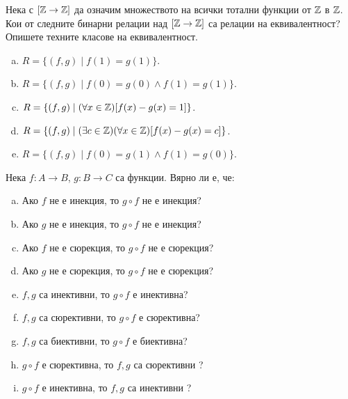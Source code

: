 \begin{problem}
  Нека с $[\mathbb{Z} \to \mathbb{Z}]$ да означим множеството на всички тотални функции от $\mathbb{Z}$ в $\mathbb{Z}$.
  Кои от следните бинарни релации над $[\mathbb{Z}\to\mathbb{Z}]$ са релации на еквивалентност? Опишете техните класове на еквивалентност.
  \begin{enumerate}[a)]
  \item
    $R = \{(f,g)\mid f(1) = g(1)\}$.
  \item
    $R = \{(f,g)\mid f(0) = g(0)\wedge f(1) = g(1)\}$.
  \item
    $R =\{(f,g)\mid (\forall x\in\mathbb{Z})[f(x)-g(x) = 1]\}$.
  \item
    $R = \{(f,g)\mid (\exists c\in\mathbb{Z})(\forall x\in\mathbb{Z})[f(x)-g(x) = c]\}$.
  \item
    $R = \{(f,g)\mid f(0) = g(1)\wedge f(1) = g(0)\}$.
  \end{enumerate}
\end{problem}

\begin{problem}
  Нека $f: A\to B$, $g: B\to C$ са функции.
  Вярно ли е, че:
  \begin{enumerate}[a)]
  \item 
    Ако $f$ не е инекция, то $g\circ f$ не е инекция?
  \item
    Ако $g$ не е инекция, то $g\circ f$ не е инекция?
  \item 
    Ако $f$ не е сюрекция, то $g\circ f$ не е сюрекция?
  \item
    Ако $g$ не е сюрекция, то $g\circ f$ не е сюрекция?
  \item
    $f,g$ са инективни, то $g\circ f$ е инективна?
  \item
    $f,g$ са сюрективни, то $g\circ f$ е сюрективна?
  \item
    $f,g$ са биективни, то $g\circ f$ е биективна?
  \item
    $g\circ f$ е сюрективна,  то $f,g$ са сюрективни ?
  \item
    $g\circ f$ е инективна, то $f,g$ са инективни ?
  \end{enumerate}
\end{problem}


